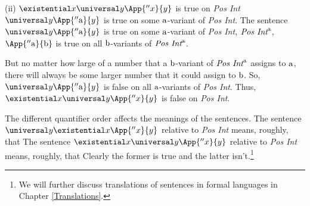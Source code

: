 \begin{PROOF}
(ii) $\existential\variable{x}\universal\variable{y}\App{''\variable{x}}{\variable{y}}$ is true on \emph{Pos Int} \Iff $\universal\variable{y}\App{''\constant{a}}{\variable{y}}$ is true on some $\mathrm{a}$-variant of \emph{Pos Int}.  The sentence $\universal\variable{y}\App{''\constant{a}}{\variable{y}}$ is true on some $\mathrm{a}$-variant of \emph{Pos Int}, $\emph{Pos Int}^{\mathrm{a}}$, \Iff $\App{''\constant{a}}{\constant{b}}$ is true on all $\mathrm{b}$-variants of $\emph{Pos Int}^{\mathrm{a}}$.

But no matter how large of a number that a $\mathrm{b}$-variant of $\emph{Pos Int}^{\mathrm{a}}$ assigns to $\mathrm{a}$, there will always be some larger number that it could assign to $\mathrm{b}$.  So, $\universal\variable{y}\App{''\constant{a}}{\variable{y}}$ is false on all $\mathrm{a}$-variants of \emph{Pos Int}.  Thus, $\existential\variable{x}\universal\variable{y}\App{''\variable{x}}{\variable{y}}$ is false on \emph{Pos Int}.
\end{PROOF}
The different quantifier order affects the meanings of the sentences.  The sentence $\universal\variable{y}\existential\variable{x}\App{''\variable{x}}{\variable{y}}$ relative to \emph{Pos Int} means, roughly, that   The sentence $\existential\variable{x}\universal\variable{y}\App{''\variable{x}}{\variable{y}}$ relative to \emph{Pos Int} means, roughly, that   Clearly the former is true and the latter isn't.\footnote{We will further discuss translations of sentences in formal languages in Chapter \ref{Translations}.}









